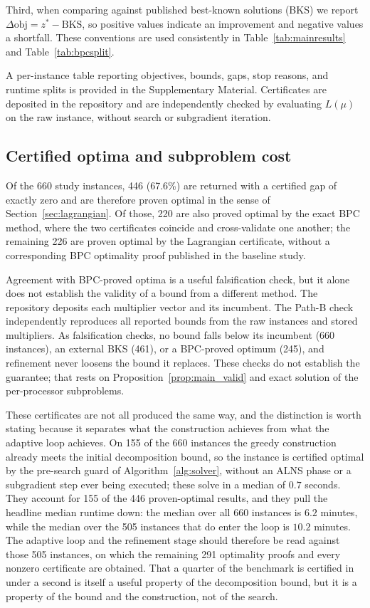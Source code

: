 \documentclass[preprint,12pt]{elsarticle}
\begin{document}
Third, when comparing against published best-known solutions (BKS) we report
$\Delta\text{obj} = z^* - \text{BKS}$, so positive values indicate an improvement
and negative values a shortfall. These conventions are used consistently in
Table~\ref{tab:mainresults} and Table~\ref{tab:bpcsplit}.

A per-instance table reporting objectives, bounds, gaps, stop reasons, and runtime splits is provided in the Supplementary Material. Certificates are deposited in the repository and are independently checked by evaluating $L(\mu)$ on the raw instance, without search or subgradient iteration.

\subsection{Certified optima and subproblem cost}

Of the 660 study instances, 446 (67.6\%) are returned with a certified gap of
exactly zero and are therefore proven optimal in the sense of
Section~\ref{sec:lagrangian}. Of those, 220 are also proved optimal by the exact
BPC method, where the two certificates coincide and cross-validate one another;
the remaining 226 are proven optimal by the Lagrangian certificate, without a corresponding BPC optimality proof published in the baseline study.

Agreement with BPC-proved optima is a useful falsification check, but it alone
does not establish the validity of a bound from a different method. The
repository deposits each multiplier vector and its incumbent. The Path-B check
independently reproduces all reported bounds from the raw instances and stored
multipliers. As falsification checks, no bound falls below its incumbent (660
instances), an external BKS (461), or a BPC-proved optimum (245), and
refinement never loosens the bound it replaces. These checks do not establish
the guarantee; that rests on Proposition~\ref{prop:main_valid} and exact
solution of the per-processor subproblems.

These certificates are not all produced the same way, and the distinction is
worth stating because it separates what the construction achieves from what the
adaptive loop achieves. On 155 of the 660 instances the greedy construction
already meets the initial decomposition bound, so the instance is certified
optimal by the pre-search guard of Algorithm~\ref{alg:solver}, without an ALNS
phase or a subgradient step ever being executed; these solve in a median of $0.7$ seconds.
They account for 155 of the 446 proven-optimal results, and they pull the
headline median runtime down: the median over all 660 instances is $6.2$ minutes,
while the median over the 505 instances that do enter the loop is $10.2$ minutes.
The adaptive loop and the refinement stage should therefore be read against those
505 instances, on which the remaining 291 optimality proofs and every nonzero
certificate are obtained. That a quarter of the benchmark is certified in under a
second is itself a useful property of the decomposition bound, but it is a
property of the bound and the construction, not of the search.
\end{document}
